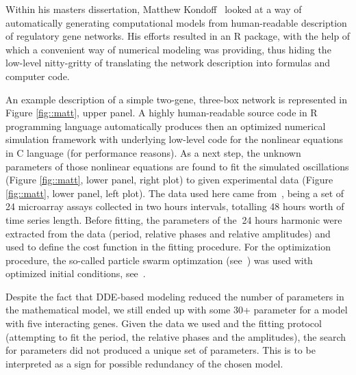 Within his masters dissertation, Matthew
Kondoff~\cite{kondoff2015modeling} looked at a way of automatically
generating computational models from human-readable description of
regulatory gene networks. His efforts resulted in an R package, with
the help of which a convenient way of numerical modeling was
providing, thus hiding the low-level nitty-gritty of translating the
network description into formulas and computer code.


An example description of a simple two-gene, three-box network is
represented in Figure \ref{fig::matt}, upper panel. A highly
human-readable source code in R programming language automatically
produces then an optimized numerical simulation framework with
underlying low-level code for the nonlinear equations in C language
(for performance reasons). As a next step, the unknown parameters of
those nonlinear equations are found to fit the simulated oscillations
(Figure \ref{fig::matt}, lower panel, right plot) to given
experimental data (Figure \ref{fig::matt}, lower panel, left plot).
The data used here came from~\cite{zhang2014circadian}, being a set of
24 microarray assays collected in two hours intervals, totalling 48
hours worth of time series length. Before fitting, the parameters of
the $~$24 hours harmonic were extracted from the data (period,
relative phases and relative amplitudes) and used to define the cost
function in the fitting procedure. For the optimization procedure, the
so-called particle swarm optimzation (see~\cite{zambrano2012hydropso})
was used with optimized initial conditions,
see~\cite{richards2004choosing}.

Despite the fact that DDE-based modeling reduced the number of
parameters in the mathematical model, we still ended up with some 30+
parameter for a model with five interacting genes. Given the data we
used and the fitting protocol (attempting to fit the period, the
relative phases and the amplitudes), the search for parameters did not
produced a unique set of parameters. This is to be interpreted as a
sign for possible redundancy of the chosen model.

